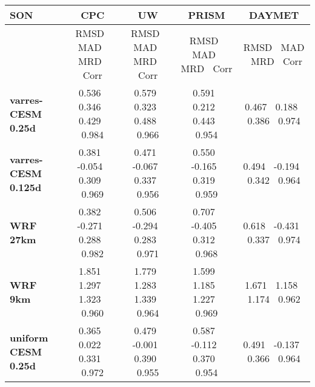 \begin{table}
\begin{center}
\begin{tabular}{lcccc}
\hline \textbf{SON} & \textbf{CPC}  & \textbf{UW} & \textbf{PRISM} & \textbf{DAYMET} \\
\hline $    $ & RMSD $\ $ MAD $\ $ MRD $\ $ Corr & RMSD $\ $ MAD $\ $ MRD $\ $ Corr & RMSD $\ $ MAD $\ $ MRD $\ $ Corr & RMSD $\ $ MAD $\ $ MRD $\ $ Corr \\
\hline \textbf{varres-CESM 0.25d} & 0.536 $\ $ 0.346 $\ $ 0.429 $\ $ 0.984 & 0.579 $\ $ 0.323 $\ $ 0.488 $\ $ 0.966 & 0.591 $\ $ 0.212 $\ $ 0.443 $\ $ 0.954 & 0.467 $\ $ 0.188 $\ $ 0.386 $\ $ 0.974 \\
\textbf{varres-CESM 0.125d} & 0.381 $\ $ -0.054 $\ $ 0.309 $\ $ 0.969 & 0.471 $\ $ -0.067 $\ $ 0.337 $\ $ 0.956 & 0.550 $\ $ -0.165 $\ $ 0.319 $\ $ 0.959 & 0.494 $\ $ -0.194 $\ $ 0.342 $\ $ 0.964 \\
\textbf{WRF 27km} & 0.382 $\ $ -0.271 $\ $ 0.288 $\ $ 0.982 & 0.506 $\ $ -0.294 $\ $ 0.283 $\ $ 0.971 & 0.707 $\ $ -0.405 $\ $ 0.312 $\ $ 0.968 & 0.618 $\ $ -0.431 $\ $ 0.337 $\ $ 0.974 \\
\textbf{WRF 9km} & 1.851 $\ $ 1.297 $\ $ 1.323 $\ $ 0.960 & 1.779 $\ $ 1.283 $\ $ 1.339 $\ $ 0.964 & 1.599 $\ $ 1.185 $\ $ 1.227 $\ $ 0.969 & 1.671 $\ $ 1.158 $\ $ 1.174 $\ $ 0.962 \\
\textbf{uniform CESM 0.25d} & 0.365 $\ $ 0.022 $\ $ 0.331 $\ $ 0.972 & 0.479 $\ $ -0.001 $\ $ 0.390 $\ $ 0.955 & 0.587 $\ $ -0.112 $\ $ 0.370 $\ $ 0.954 & 0.491 $\ $ -0.137 $\ $ 0.366 $\ $ 0.964 \\
\hline
\end{tabular}
\end{center}
\end{table}


